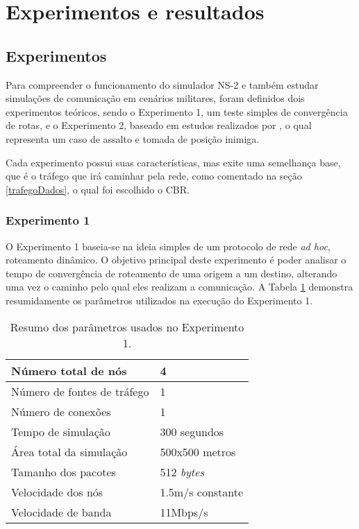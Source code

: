 \section{Experimentos e resultados}\label{experimentos}
\subsection{Experimentos}
Para compreender o funcionamento do simulador NS-2 e tamb\'em estudar simula\c{c}\~oes de comunica\c{c}\~ao em cen\'arios militares, foram definidos dois experimentos te\'oricos, sendo o Experimento 1, um teste simples de converg\^encia de rotas, e o Experimento 2, baseado em estudos realizados por \cite{pereira}, o qual representa um caso de assalto e tomada de posi\c{c}\~ao inimiga.

Cada experimento possui suas caracter\'isticas, mas exite uma semelhan\c{c}a base, que \'e o tr\'afego que ir\'a caminhar pela rede, como comentado na se\c{c}\~ao \ref{trafegoDados}, o qual foi escolhido o CBR.

\subsubsection{Experimento 1}
O Experimento 1 baseia-se na ideia simples de um protocolo de rede \textit{ad hoc}, roteamento din\^amico.
O objetivo principal deste experimento \'e poder analisar o tempo de converg\^encia de roteamento de uma origem a um destino, alterando uma vez o caminho pelo qual eles realizam a comunica\c{c}\~ao.
A Tabela \ref{tabParamExp1} demonstra resumidamente os par\^ametros utilizados na execu\c{c}\~ao do Experimento 1.

\begin{table}[H]
	\centering
	\caption{Resumo dos par\^ametros usados no Experimento 1.}
	\begin{tabular}{ | l | l | }
		\hline
		N\'umero total de n\'os & 4 \\ \hline
		N\'umero de fontes de tr\'afego & 1 \\ \hline
		N\'umero de conex\~oes & 1 \\ \hline
		Tempo de simula\c{c}\~ao & 300 segundos \\ \hline
		\'Area total da simula\c{c}\~ao & 500x500 metros \\ \hline
		Tamanho dos pacotes & 512 \textit{bytes} \\ \hline	
		Velocidade dos n\'os & 1.5m/s constante \\ \hline
		Velocidade de banda & 11Mbps/s \\ \hline
	\end{tabular}
	\label{tabParamExp1}
\end{table}

